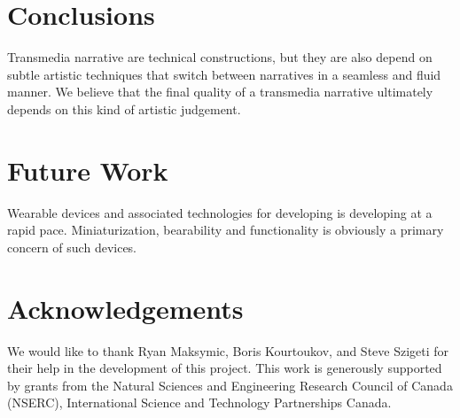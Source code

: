 \documentclass{chi-ext}
\begin{document}
\section{Conclusions}
Transmedia narrative are technical constructions, but they are also depend on subtle artistic  techniques that switch between narratives in a seamless and fluid manner. We believe that the final quality of a transmedia narrative ultimately depends on this kind of artistic judgement.

\section{Future Work}
Wearable devices and associated technologies for developing is developing at a rapid pace.
Miniaturization, bearability and functionality is obviously a primary concern of such devices. 

\section{Acknowledgements}

We would like to thank Ryan Maksymic, Boris Kourtoukov, and Steve Szigeti for their help in the development of this project. This work is generously supported by grants from the Natural Sciences and Engineering Research Council of Canada (NSERC), International Science and Technology Partnerships Canada.

\balance


\end{document}

